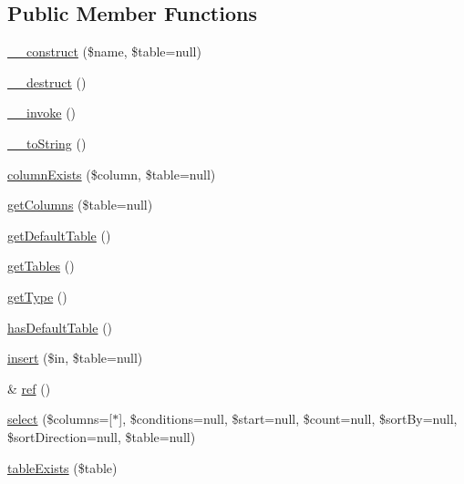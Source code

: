 \subsection*{Public Member Functions}
\begin{DoxyCompactItemize}
\item 
\hyperlink{class_s_q_lite_database_a98c33e722c2aeac0d41ff40cfb705f5e}{\+\_\+\+\_\+construct} (\$name, \$table=null)
\item 
\hyperlink{class_s_q_lite_database_a421831a265621325e1fdd19aace0c758}{\+\_\+\+\_\+destruct} ()
\item 
\hyperlink{class_s_q_lite_database_a9aac7e1475efe923de4e19cc2511f092}{\+\_\+\+\_\+invoke} ()
\item 
\hyperlink{class_s_q_lite_database_a7516ca30af0db3cdbf9a7739b48ce91d}{\+\_\+\+\_\+to\+String} ()
\item 
\hyperlink{class_s_q_lite_database_a42c4cefdb183a7caa3115193a811d893}{column\+Exists} (\$column, \$table=null)
\item 
\hyperlink{class_s_q_lite_database_a5cc0962e790b9ccffd2ca9c77cead320}{get\+Columns} (\$table=null)
\item 
\hyperlink{class_s_q_lite_database_af54c3eed64c3e3dfb06a2541289ff0da}{get\+Default\+Table} ()
\item 
\hyperlink{class_s_q_lite_database_a61b9097ace78236a1a7f9cfd9e9ab01c}{get\+Tables} ()
\item 
\hyperlink{class_s_q_lite_database_a830b5c75df72b32396701bc563fbe3c7}{get\+Type} ()
\item 
\hyperlink{class_s_q_lite_database_ad0aa1804fc79c22b46596db136320017}{has\+Default\+Table} ()
\item 
\hyperlink{class_s_q_lite_database_a8e5626f114925dee9986c8edbfc3ec05}{insert} (\$in, \$table=null)
\item 
\& \hyperlink{class_s_q_lite_database_ae6979f06c8e38dbe758ff53f7395531f}{ref} ()
\item 
\hyperlink{class_s_q_lite_database_a1efc6b974510d4c668660f1abe184182}{select} (\$columns=\mbox{[}\textquotesingle{}$\ast$\textquotesingle{}\mbox{]}, \$conditions=null, \$start=null, \$count=null, \$sort\+By=null, \$sort\+Direction=null, \$table=null)
\item 
\hyperlink{class_s_q_lite_database_ae7cdaa744d52a1eb0103e377023ca528}{table\+Exists} (\$table)
\end{DoxyCompactItemize}
